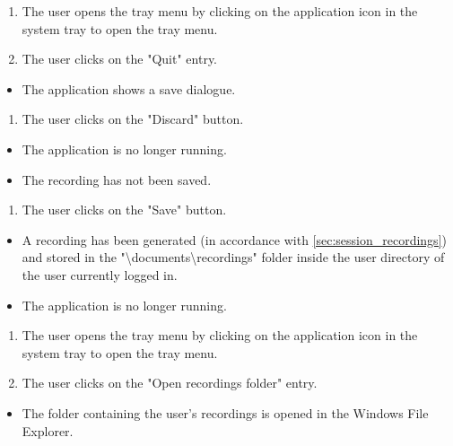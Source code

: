 \begin{tests}
    {\begin{enumerate}
        \item The \gls{user} opens the tray menu by clicking on the application icon in the system tray to open the tray menu.
        \item The \gls{user} clicks on the "Quit" entry.
    \end{enumerate}}
    {\begin{itemize}
        \item The application shows a save dialogue.
    \end{itemize}}

    {\begin{enumerate}
        \item The \gls{user} clicks on the "Discard" button.
    \end{enumerate}}
    {\begin{itemize}
        \item The application is no longer running.
        \item The recording has not been saved.
    \end{itemize}}

    {\begin{enumerate}
        \item The \gls{user} clicks on the "Save" button.
    \end{enumerate}}
    {\begin{itemize}
        \item A recording has been generated (in accordance with \ref{sec:session_recordings}) and stored in the "\textbackslash documents\textbackslash recordings" folder inside the user directory of the user currently logged in.
        \item The application is no longer running.
    \end{itemize}}

    {\begin{enumerate}
        \item The \gls{user} opens the tray menu by clicking on the application icon in the system tray to open the tray menu.
        \item The \gls{user} clicks on the "Open recordings folder" entry.
    \end{enumerate}}
    {\begin{itemize}
        \item The folder containing the \gls{user}'s recordings is opened in the Windows File Explorer.
    \end{itemize}}
\end{tests}

